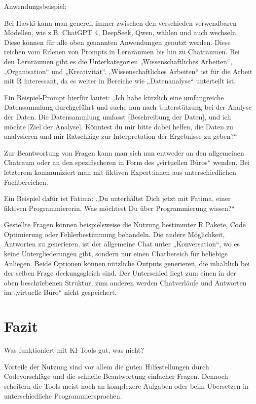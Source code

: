 \documentclass[
  letterpaper,
  DIV=11]{scrreprt}
\begin{document}
Anwendungsbeispiel:

Bei Hawki kann man generell immer zwischen den verschieden verwendbaren
Modellen, wie z.B. ChatGPT 4, DeepSeek, Qwen, wählen und auch wechseln.
Diese können für alle oben genannten Anwendungen genutzt werden. Diese
reichen vom Erlenen von Prompts in Lernräumen bis hin zu Chaträumen. Bei
den Lernräumen gibt es die Unterkategorien „Wissenschaftliches
Arbeiten``, „Organisation`` und „Kreativität``. „Wissenschaftliches
Arbeiten`` ist für die Arbeit mit R interessant, da es weiter in
Bereiche wie „Datenanalyse`` unterteilt ist.

Ein Beispiel-Prompt hierfür lautet: „Ich habe kürzlich eine umfangreiche
Datensammlung durchgeführt und suche nun nach Unterstützung bei der
Analyse der Daten. Die Datensammlung umfasst {[}Beschreibung der
Daten{]}, und ich möchte {[}Ziel der Analyse{]}. Könntest du mir bitte
dabei helfen, die Daten zu analysieren und mir Ratschläge zur
Interpretation der Ergebnisse zu geben?{}``

Zur Beantwortung von Fragen kann man sich nun entweder an den
allgemeinen Chatraum oder an den spezifischeren in Form des „virtuellen
Büros`` wenden. Bei letzterem kommuniziert man mit fiktiven Expert:innen
aus unterschiedlichen Fachbereichen.

Ein Beispiel dafür ist Fatima: „Du unterhältst Dich jetzt mit Fatima,
einer fiktiven Programmiererin. Was möchtest Du über Programmierung
wissen?{}``

Gestellte Fragen können beispielsweise die Nutzung bestimmter R Pakete,
Code Optimierung oder Fehlerbestimmung behandeln. Die andere
Möglichkeit, Antworten zu generieren, ist der allgemeine Chat unter
„Konversation``, wo es keine Untergliederungen gibt, sondern nur einen
Chatbereich für beliebige Anliegen. Beide Optionen können nützliche
Outputs generieren, die inhaltlich bei der selben Frage deckungsgleich
sind. Der Unterschied liegt zum einen in der oben beschriebenen
Struktur, zum anderen werden Chatverläufe und Antworten im „virtuelle
Büro`` nicht gespeichert.

\section{Fazit}\label{fazit}

Was funktioniert mit KI-Tools gut, was nicht?

Vorteile der Nutzung sind vor allem die guten Hilfestellungen durch
Codevorschläge und die schnelle Beantwortung einfacher Fragen. Dennoch
scheitern die Tools meist noch an komplexere Aufgaben oder beim
Übersetzen in unterschiedliche Programmiersprachen.
\end{document}
